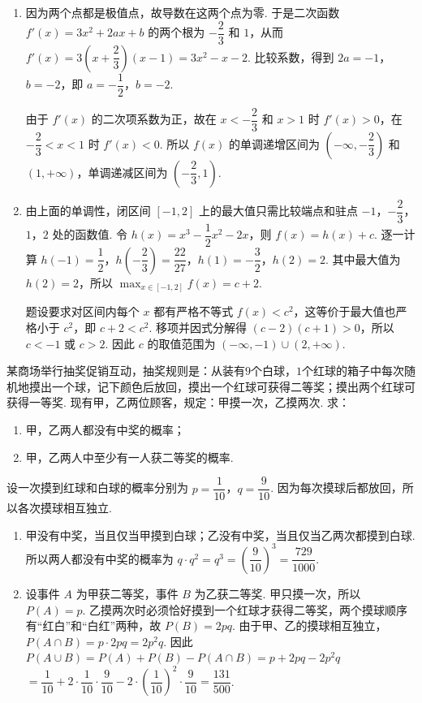 \begin{solution}
\begin{enumerate}
    \item 因为两个点都是极值点，故导数在这两个点为零. 于是二次函数 \(f'(x)=3x^2+2ax+b\) 的两个根为 \(-\dfrac23\) 和 \(1\)，从而
    \(f'(x)=3\left(x+\dfrac23\right)(x-1)=3x^2-x-2\). 比较系数，得到 \(2a=-1\)，\(b=-2\)，即 \(a=-\dfrac12\)，\(b=-2\).

    由于 \(f'(x)\) 的二次项系数为正，故在 \(x<-\dfrac23\) 和 \(x>1\) 时 \(f'(x)>0\)，在 \(-\dfrac23<x<1\) 时 \(f'(x)<0\). 所以 \(f(x)\) 的单调递增区间为 \(\left(-\infty,-\dfrac23\right)\) 和 \((1,+\infty)\)，单调递减区间为 \(\left(-\dfrac23,1\right)\).
    \item 由上面的单调性，闭区间 \([-1,2]\) 上的最大值只需比较端点和驻点 \(-1\)，\(-\dfrac23\)，\(1\)，\(2\) 处的函数值. 令 \(h(x)=x^3-\dfrac12x^2-2x\)，则 \(f(x)=h(x)+c\). 逐一计算
    \(h(-1)=\dfrac12\)，\(h\left(-\dfrac23\right)=\dfrac{22}{27}\)，\(h(1)=-\dfrac32\)，\(h(2)=2\). 其中最大值为 \(h(2)=2\)，所以 \(\max_{x\in[-1,2]}f(x)=c+2\).

    题设要求对区间内每个 \(x\) 都有严格不等式 \(f(x)<c^2\)，这等价于最大值也严格小于 \(c^2\)，即 \(c+2<c^2\). 移项并因式分解得 \((c-2)(c+1)>0\)，所以 \(c<-1\) 或 \(c>2\). 因此 \(c\) 的取值范围为 \(\left(-\infty,-1\right)\cup(2,+\infty)\).
\end{enumerate}
\end{solution}

\begin{problem}
某商场举行抽奖促销互动，抽奖规则是：从装有\(9\)个白球，\(1\)个红球的箱子中每次随机地摸出一个球，记下颜色后放回，摸出一个红球可获得二等奖；摸出两个红球可获得一等奖. 现有甲，乙两位顾客，规定：甲摸一次，乙摸两次. 求：
\begin{enumerate}
\item 甲，乙两人都没有中奖的概率；
\item 甲，乙两人中至少有一人获二等奖的概率.
\end{enumerate}
\end{problem}

\begin{solution}
设一次摸到红球和白球的概率分别为 \(p=\dfrac1{10}\)，\(q=\dfrac9{10}\). 因为每次摸球后都放回，所以各次摸球相互独立.

\begin{enumerate}
\item 甲没有中奖，当且仅当甲摸到白球；乙没有中奖，当且仅当乙两次都摸到白球. 所以两人都没有中奖的概率为 \(q\cdot q^2=q^3=\left(\dfrac9{10}\right)^3=\dfrac{729}{1000}\).
\item 设事件 \(A\) 为甲获二等奖，事件 \(B\) 为乙获二等奖. 甲只摸一次，所以 \(P(A)=p\). 乙摸两次时必须恰好摸到一个红球才获得二等奖，两个摸球顺序有“红白”和“白红”两种，故 \(P(B)=2pq\). 由于甲、乙的摸球相互独立，\(P(A\cap B)=p\cdot2pq=2p^2q\). 因此
\(P(A\cup B)=P(A)+P(B)-P(A\cap B)=p+2pq-2p^2q\)
\(=\dfrac1{10}+2\cdot\dfrac1{10}\cdot\dfrac9{10}-2\cdot\left(\dfrac1{10}\right)^2\cdot\dfrac9{10}=\dfrac{131}{500}\).
\end{enumerate}
\end{solution}

